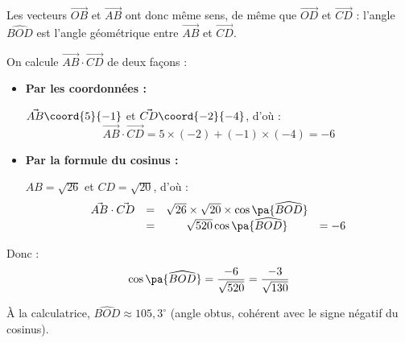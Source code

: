 \begin{methode}
\begin{correction}
		Les vecteurs $\vec{OB}$ et $\vec{AB}$ ont donc même sens, de même que $\vec{OD}$ et $\vec{CD}$ : l'angle $\widehat{BOD}$ est l'angle géométrique entre $\vec{AB}$ et $\vec{CD}$.

		On calcule $\vec{AB} \cdot \vec{CD}$ de deux façons :
		\begin{itemize}
			\item \textbf{Par les coordonnées :}

			      $\vec{AB}\coord{5}{-1}$ et $\vec{CD}\coord{-2}{-4}$, d'où :
			      \[
				      \vec{AB} \cdot \vec{CD} = 5 \times (-2) + (-1) \times (-4) = -6
			      \]

			\item \textbf{Par la formule du cosinus :}

			      $AB = \sqrt{26}$ et $CD = \sqrt{20}$, d'où :
			      \[
				      \begin{array}{rccl}
					      \vec{AB} \cdot \vec{CD} & = & \sqrt{26} \times \sqrt{20} \times \cos\pa{\widehat{BOD}} &     \\
					                              & = & \sqrt{520}\cos\pa{\widehat{BOD}}                         & =-6
				      \end{array}
			      \]
		\end{itemize}

		Donc :
		\[
			\cos\pa{\widehat{BOD}} = \dfrac{-6}{\sqrt{520}} = \dfrac{-3}{\sqrt{130}}
		\]

		À la calculatrice, $\widehat{BOD} \approx 105{,}3^\circ$ (angle obtus, cohérent avec le signe négatif du cosinus).
	\end{correction}
\end{methode}

